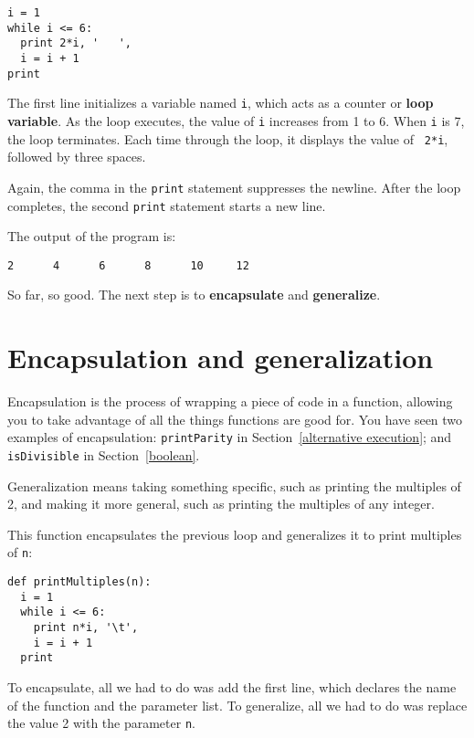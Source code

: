 \beforeverb
\begin{verbatim}
i = 1
while i <= 6:
  print 2*i, '   ',
  i = i + 1
print
\end{verbatim}
\afterverb
%
The first line initializes a variable named {\tt i}, which acts as a
counter or {\bf loop variable}.  As the loop executes, the value of
{\tt i} increases from 1 to 6.  When {\tt i} is 7, the loop
terminates.  Each time through the loop, it displays the value of {\tt
2*i}, followed by three spaces.  

Again, the comma in the {\tt print} statement suppresses the newline.
After the loop completes, the second {\tt print} statement starts a
new line.

The output of the program is:

\beforeverb
\begin{verbatim}
2      4      6      8      10     12
\end{verbatim}
\afterverb
%
So far, so good. The next step is to {\bf encapsulate} and {\bf generalize}.


\section{Encapsulation and generalization}
\label{encapsulation}

Encapsulation is the process of wrapping a piece of code in a
function, allowing you to take advantage of all the things functions
are good for.  You have seen two examples of encapsulation:
{\tt printParity} in Section~\ref{alternative execution}; and
{\tt isDivisible} in Section~\ref{boolean}.

Generalization means taking something specific, such as printing the
multiples of 2, and making it more general, such as printing the
multiples of any integer.

This function encapsulates the previous loop and
generalizes it to print multiples of {\tt n}:

\beforeverb
\begin{verbatim}
def printMultiples(n):
  i = 1
  while i <= 6:
    print n*i, '\t',
    i = i + 1
  print
\end{verbatim}
\afterverb
%
To encapsulate, all we had to do was add the first line, which
declares the name of the function and the parameter list.  To
generalize, all we had to do was replace the value 2 with the
parameter {\tt n}.

